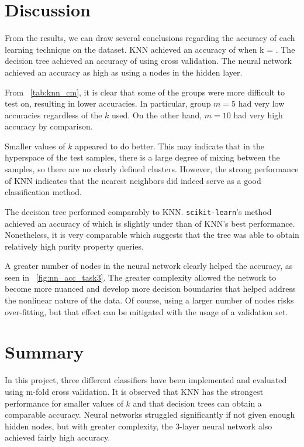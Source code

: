 \documentclass[paper=a4, fontsize=11pt,twoside]{scrartcl}	%
\newcommand{\figref}[1]{\figurename~\ref{#1}}
\newcommand{\tabref}[1]{\tablename~\ref{#1}}
\begin{document}
\section{Discussion}
From the results, we can draw several conclusions regarding the accuracy of each learning technique on the dataset. KNN achieved an accuracy of when k = . The decision tree achieved an accuracy of using cross validation. The neural network achieved an accuracy as high as using a nodes in the hidden layer.

From \tabref{tab:knn_cm}, it is clear that some of the groups were more difficult to test on, resulting in lower accuracies. In particular, group $m=5$ had very low accuracies regardless of the $k$ used. On the other hand, $m=10$ had very high accuracy by comparison.

Smaller values of $k$ appeared to do better. This may indicate that in the hyperspace of the test samples, there is a large degree of mixing between the samples, so there are no clearly defined clusters. However, the strong performance of KNN indicates that the nearest neighbors did indeed serve as a good classification method.

The decision tree performed comparably to KNN. \texttt{scikit-learn}'s method achieved an accuracy of which is slightly under than of KNN's best performance. Nonetheless, it is very comparable which suggests that the tree was able to obtain relatively high purity property queries.

A greater number of nodes in the neural network clearly helped the accuracy, as seen in \figref{fig:nn_acc_task3}. The greater complexity allowed the network to become more nuanced and develop more decision boundaries that helped address the nonlinear nature of the data. Of course, using a larger number of nodes risks over-fitting, but that effect can be mitigated with the usage of a validation set.


\section{Summary}
In this project, three different classifiers have been implemented and evaluated using m-fold cross validation. It is observed that KNN has the strongest performance for smaller values of $k$ and that decision trees can obtain a comparable accuracy. Neural networks struggled significantly if not given enough hidden nodes, but with greater complexity, the 3-layer neural network also achieved fairly high accuracy.
\end{document}
